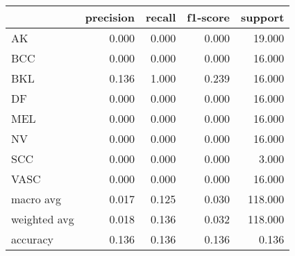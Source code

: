 \begin{tabular}{lrrrr}
\toprule
 & precision & recall & f1-score & support \\
\midrule
AK & 0.000 & 0.000 & 0.000 & 19.000 \\
BCC & 0.000 & 0.000 & 0.000 & 16.000 \\
BKL & 0.136 & 1.000 & 0.239 & 16.000 \\
DF & 0.000 & 0.000 & 0.000 & 16.000 \\
MEL & 0.000 & 0.000 & 0.000 & 16.000 \\
NV & 0.000 & 0.000 & 0.000 & 16.000 \\
SCC & 0.000 & 0.000 & 0.000 & 3.000 \\
VASC & 0.000 & 0.000 & 0.000 & 16.000 \\
macro avg & 0.017 & 0.125 & 0.030 & 118.000 \\
weighted avg & 0.018 & 0.136 & 0.032 & 118.000 \\
accuracy & 0.136 & 0.136 & 0.136 & 0.136 \\
\bottomrule
\end{tabular}
